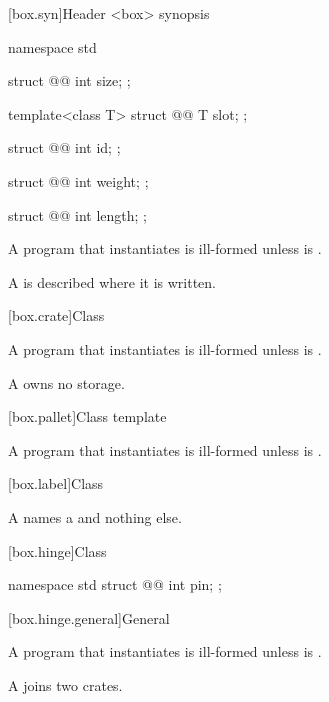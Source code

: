 [box.syn]{Header <box> synopsis}

\begin{codeblock}
namespace std {
  struct @@ {
    int size;
  };

  template<class T>
  struct @@ {
    T slot;
  };

  struct @@ {
    int id;
  };

  struct @@ {
    int weight;
  };

  struct @@ {
    int length;
  };
}
\end{codeblock}

\pnum
A program that instantiates  is ill-formed unless  is .

\pnum
\remarks
A  is described where it is written.

[box.crate]{Class }

\pnum
A program that instantiates  is ill-formed unless  is .

\pnum
\remarks
A  owns no storage.

[box.pallet]{Class template }

\pnum
A program that instantiates  is ill-formed unless  is .

[box.label]{Class }

\pnum
\remarks
A  names a  and nothing else.

[box.hinge]{Class }

\begin{codeblock}
namespace std {
  struct @@ {
    int pin;
  };
}
\end{codeblock}

[box.hinge.general]{General}

\pnum
A program that instantiates  is ill-formed unless  is .

\pnum
\remarks
A  joins two crates.
